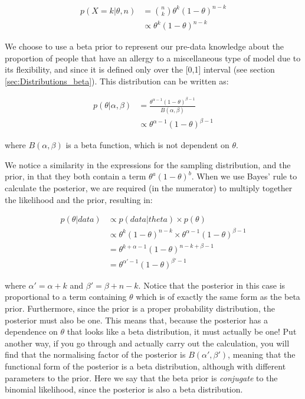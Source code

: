 \documentclass[11pt,fullpage]{book}
\begin{document}
\begin{equation}
\begin{align}
p(X=k|\theta,n) &= {n \choose k} \theta^k (1-\theta)^{n-k}\\
&\propto \theta^k (1-\theta)^{n-k}
\end{align}
\end{equation}

We choose to use a beta prior to represent our pre-data knowledge about the proportion of people that have an allergy to a miscellaneous type of model due to its flexibility, and since it is defined only over the [0,1] interval (see section \ref{sec:Distributions_beta}). This distribution can be written as:

\begin{equation}
\begin{align}
p(\theta|\alpha,\beta) &= \frac{\theta^{\alpha-1}(1-\theta)^{\beta-1}}{B(\alpha,\beta)}\\
&\propto \theta^{\alpha-1}(1-\theta)^{\beta-1}
\end{align}
\end{equation}

where $B(\alpha,\beta)$ is a beta function, which is not dependent on $\theta$.

We notice a similarity in the expressions for the sampling distribution, and the prior, in that they both contain a term $\theta^a (1-\theta)^b$. When we use Bayes' rule to calculate the posterior, we are required (in the numerator) to multiply together the likelihood and the prior, resulting in:

\begin{equation}
\begin{align}
p(\theta|data) &\propto p(data|theta) \times p(\theta)\\
&\propto \theta^k (1-\theta)^{n-k} \times \theta^{\alpha-1}(1-\theta)^{\beta-1}\\
&= \theta^{k+ \alpha - 1} (1-\theta)^{n-k + \beta - 1}\\
&= \theta^{\alpha' - 1}(1-\theta)^{\beta'-1}
\end{align}
\end{equation}

where $\alpha'=\alpha + k$ and $\beta'= \beta + n - k$. Notice that the posterior in this case is proportional to a term containing $\theta$ which is of exactly the same form as the beta prior. Furthermore, since the prior is a proper probability distribution, the posterior must also be one. This means that, because the posterior has a dependence on $\theta$ that looks like a beta distribution, it must actually be one! Put another way, if you go through and actually carry out the calculation, you will find that the normalising factor of the posterior is $B(\alpha',\beta')$, meaning that the functional form of the posterior is a beta distribution, although with different parameters to the prior. Here we say that the beta prior is \textit{conjugate} to the binomial likelihood, since the posterior is also a beta distribution.
\end{document}
